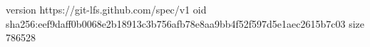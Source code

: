 version https://git-lfs.github.com/spec/v1
oid sha256:eef9daff0b0068e2b18913c3b756afb78e8aa9bb4f52f597d5e1aec2615b7c03
size 786528
